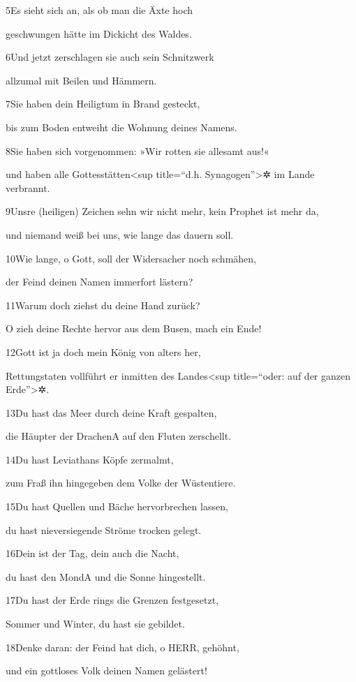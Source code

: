 5Es sieht sich an, als ob man die Äxte hoch

geschwungen hätte im Dickicht des Waldes.

6Und jetzt zerschlagen sie auch sein Schnitzwerk

allzumal mit Beilen und Hämmern.

7Sie haben dein Heiligtum in Brand gesteckt,

bis zum Boden entweiht die Wohnung deines Namens.

8Sie haben sich vorgenommen: »Wir rotten sie allesamt aus!«

und haben alle Gottesstätten\textless sup title=``d.h.
Synagogen''\textgreater✲ im Lande verbrannt.

9Unsre (heiligen) Zeichen sehn wir nicht mehr, kein Prophet ist mehr da,

und niemand weiß bei uns, wie lange das dauern soll.

10Wie lange, o Gott, soll der Widersacher noch schmähen,

der Feind deinen Namen immerfort lästern?

11Warum doch ziehst du deine Hand zurück?

O zieh deine Rechte hervor aus dem Busen, mach ein Ende!

12Gott ist ja doch mein König von alters her,

Rettungstaten vollführt er inmitten des Landes\textless sup
title=``oder: auf der ganzen Erde''\textgreater✲.

13Du hast das Meer durch deine Kraft gespalten,

die Häupter der Drachen{A} auf den Fluten zerschellt.

14Du hast Leviathans Köpfe zermalmt,

zum Fraß ihn hingegeben dem Volke der Wüstentiere.

15Du hast Quellen und Bäche hervorbrechen lassen,

du hast nieversiegende Ströme trocken gelegt.

16Dein ist der Tag, dein auch die Nacht,

du hast den Mond{A} und die Sonne hingestellt.

17Du hast der Erde rings die Grenzen festgesetzt,

Sommer und Winter, du hast sie gebildet.

18Denke daran: der Feind hat dich, o HERR, gehöhnt,

und ein gottloses Volk deinen Namen gelästert!

